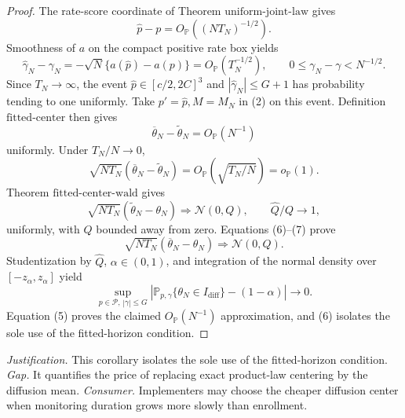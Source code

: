 \documentclass{article}
\begin{document}
\begin{proof}
The rate-score coordinate of Theorem \(\mathrm{uniform\mbox{-}joint\mbox{-}law}\) gives
\[
 \widehat p-p=O_{\mathbb P}((NT_N)^{-1/2}).                   \tag{3}
\]
Smoothness of \(a\) on the compact positive rate box yields
\[
 \widehat\gamma_N-\gamma_N
 =-\sqrt N\{a(\widehat p)-a(p)\}=O_{\mathbb P}(T_N^{-1/2}),
 \qquad 0\leq\gamma_N-\gamma<N^{-1/2}.                       \tag{4}
\]
Since \(T_N\to\infty\), the event \(\widehat p\in[c/2,2C]^3\) and \(|\widehat\gamma_N|\leq G+1\) has probability tending to one uniformly.  Take \(p'=\widehat p,M=M_N\) in (2) on this event.  Definition \(\mathrm{fitted\mbox{-}center}\) then gives
\[
 \overline\theta_N-\widetilde\theta_N=O_{\mathbb P}(N^{-1}) \tag{5}
\]
uniformly.  Under \(T_N/N\to0\),
\[
 \sqrt{NT_N}(\overline\theta_N-\widetilde\theta_N)
 =O_{\mathbb P}(\sqrt{T_N/N})=o_{\mathbb P}(1).               \tag{6}
\]
Theorem \(\mathrm{fitted\mbox{-}center\mbox{-}wald}\) gives
\[
 \sqrt{NT_N}(\widetilde\theta_N-\theta_N)
 \Rightarrow\mathcal N(0,Q),
 \qquad \widehat Q/Q\to1,                                    \tag{7}
\]
uniformly, with \(Q\) bounded away from zero.  Equations (6)--(7) prove
\[
 \sqrt{NT_N}(\overline\theta_N-\theta_N)
 \Rightarrow\mathcal N(0,Q).
\]
Studentization by \(\widehat Q\), \(\alpha\in(0,1)\), and integration of the normal density over \([-z_\alpha,z_\alpha]\) yield
\[
 \sup_{p\in\mathcal P,\,|\gamma|\leq G}
 \left|\mathbb P_{p,\gamma}\{\theta_N\in I_{\mathrm{diff}}\}-(1-\alpha)\right|
 \longrightarrow0.
\]
Equation (5) proves the claimed \(O_{\mathbb P}(N^{-1})\) approximation, and (6) isolates the sole use of the fitted-horizon condition.
\end{proof}
\par\smallskip\noindent \textit{Justification.} This corollary isolates the sole use of the fitted-horizon condition. \textit{Gap.} It quantifies the price of replacing exact product-law centering by the diffusion mean. \textit{Consumer.} Implementers may choose the cheaper diffusion center when monitoring duration grows more slowly than enrollment.
\end{document}
